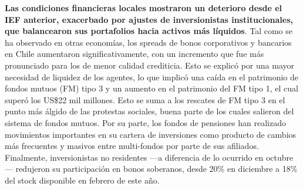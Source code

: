 \documentclass[
]{book}
\begin{document}
\textbf{Las condiciones financieras locales mostraron un deterioro desde el IEF anterior, exacerbado por ajustes de inversionistas institucionales, que balancearon sus portafolios hacia activos más líquidos}. Tal como
se ha observado en otras economías, los spreads de bonos corporativos y
bancarios en Chile aumentaron significativamente, con un incremento que fue
más pronunciado para los de menor calidad crediticia. Esto se explicó por una
mayor necesidad de liquidez de los agentes, lo que implicó una caída en el
patrimonio de fondos mutuos (FM) tipo 3 y un aumento en el patrimonio del
FM tipo 1, el cual superó los US\$22 mil millones. Esto se suma a los rescates
de FM tipo 3 en el punto más álgido de las protestas sociales, buena parte de
los cuales salieron del sistema de fondos mutuos. Por su parte, los fondos de
pensiones han realizado movimientos importantes en su cartera de inversiones
como producto de cambios más frecuentes y masivos entre multi-fondos por
parte de sus afiliados. Finalmente, inversionistas no residentes ---a diferencia
de lo ocurrido en octubre--- redujeron su participación en bonos soberanos,
desde 20\% en diciembre a 18\% del stock disponible en febrero de este año.
\end{document}
